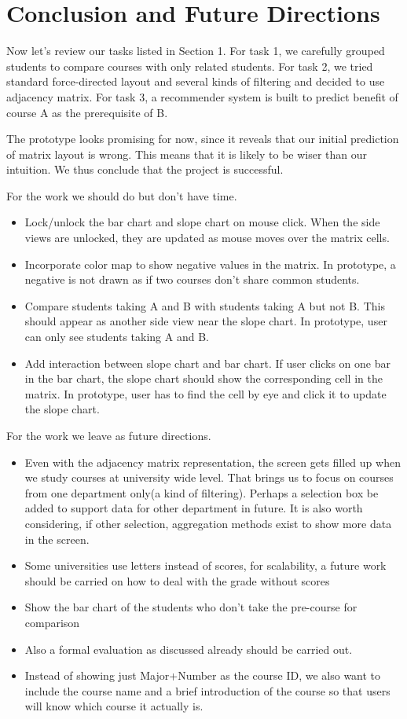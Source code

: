 \section{Conclusion and Future Directions}
\label{sec:conclusion}

Now let's review our tasks listed in Section 1. For task 1, we carefully grouped students to compare courses with only related students. For task 2, we tried standard force-directed layout and several kinds of filtering and decided to use adjacency matrix. For task 3, a recommender system is built to predict benefit of course A as the prerequisite of B.

The prototype looks promising for now, since it reveals that our initial prediction of matrix layout is wrong. This means that it is likely to be wiser than our intuition. We thus conclude that the project is successful. 

For the work we should do but don't have time.
\begin{itemize}
\item Lock/unlock the bar chart and slope chart on mouse click. When the side views are unlocked, they are updated as mouse moves over the matrix cells.

\item Incorporate color map to show negative values in the matrix. In prototype, a negative is not drawn as if two courses don't share common students.

\item Compare students taking A and B with students taking A but not B. This should appear as another side view near the slope chart. In prototype, user can only see students taking A and B.

\item Add interaction between slope chart and bar chart. If user clicks on one bar in the bar chart, the slope chart should show the corresponding cell in the matrix. In prototype, user has to find the cell by eye and click it to update the slope chart.
\end{itemize}
For the work we leave as future directions.
\begin{itemize}
\item Even with the adjacency matrix representation, the screen gets filled up when we study courses at university wide level. That brings us to focus on courses from one department only(a kind of filtering). Perhaps a selection box be added to support data for other department in future. It is also worth considering, if other selection, aggregation methods exist to show more data in the screen.
\item Some universities use letters instead of scores, for scalability, a future work should be carried on how to deal with the grade without scores
\item Show the bar chart of the students who don't take the pre-course for comparison
\item Also a formal evaluation as discussed already should be carried out. 
\item Instead of showing just Major+Number as the course ID, we also want to include the course name and a brief introduction of the course so that users will know which course it actually is.
\end{itemize}
